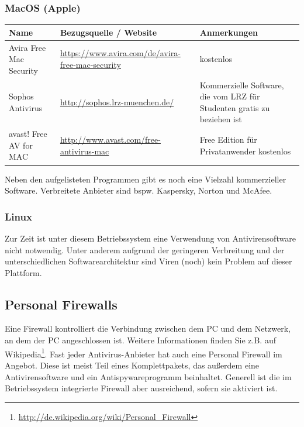 \documentclass[a4paper,12pt]{scrartcl}
\begin{document}
\subsubsection*{MacOS (Apple)}
\begin{center}
  \begin{tabularx}{\linewidth}{|p{.2\linewidth}XX|}
    \hline
    Name & Bezugsquelle / Website & Anmerkungen\\
    \hline \hline
    Avira Free Mac Security & \url{https://www.avira.com/de/avira-free-mac-security} & kostenlos\\
    \hline
    Sophos Antivirus & \url{http://sophos.lrz-muenchen.de/} & Kommerzielle Software, die vom LRZ für Studenten gratis zu beziehen ist\\
    \hline
    avast! Free AV for MAC & \url{http://www.avast.com/free-antivirus-mac} & Free Edition für Privatanwender kostenlos\\
    \hline
  \end{tabularx}
\end{center}
Neben den aufgelisteten Programmen gibt es noch eine Vielzahl kommerzieller Software. Verbreitete Anbieter sind bspw. Kaspersky, Norton und McAfee.

\subsubsection*{Linux}

Zur Zeit ist unter diesem Betriebssystem eine Verwendung von Antivirensoftware nicht notwendig. Unter anderem aufgrund der geringeren Verbreitung und der unterschiedlichen Softwarearchitektur sind Viren (noch) kein Problem auf dieser Plattform.



\subsection*{Personal Firewalls}

Eine Firewall kontrolliert die Verbindung zwischen dem PC und dem Netzwerk, an dem der PC angeschlossen ist. Weitere Informationen finden Sie z.B. auf Wikipedia\footnote{\url{http://de.wikipedia.org/wiki/Personal\_Firewall}}.
Fast jeder Antivirus-Anbieter hat auch eine Personal Firewall im Angebot. Diese ist meist Teil eines Komplettpakets, das außerdem eine Antivirensoftware und ein Antispywareprogramm beinhaltet.
Generell ist die im Betriebssystem integrierte Firewall aber ausreichend, sofern sie aktiviert ist.
\end{document}
